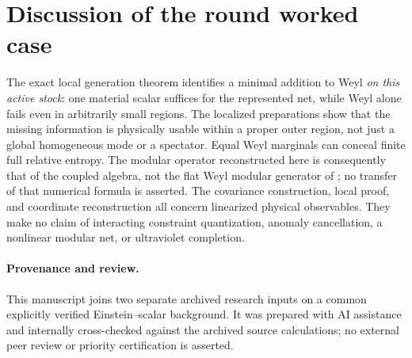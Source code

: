 \documentclass[11pt]{article}
\begin{document}
\section{Discussion of the round worked case}

The exact local generation theorem identifies a minimal addition to Weyl \emph{on this active stock}: one material scalar suffices for the represented net, while Weyl alone fails even in arbitrarily small regions. The localized preparations show that the missing information is physically usable within a proper outer region, not just a global homogeneous mode or a spectator. Equal Weyl marginals can conceal finite full relative entropy. The modular operator reconstructed here is consequently that of the coupled algebra, not the flat Weyl modular generator of \cite{p21}; no transfer of that numerical formula is asserted. The covariance construction, local proof, and coordinate reconstruction all concern linearized physical observables. They make no claim of interacting constraint quantization, anomaly cancellation, a nonlinear modular net, or ultraviolet completion.

\paragraph{Provenance and review.}
This manuscript joins two separate archived research inputs on a common explicitly verified Einstein--scalar background. It was prepared with AI assistance and internally cross-checked against the archived source calculations; no external peer review or priority certification is asserted.
\end{document}
